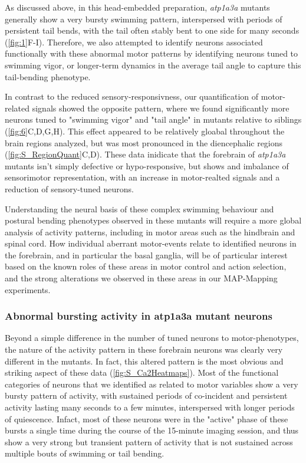 As discussed above, in this head-embedded preparation, \emph{atp1a3a} mutants generally show a very bursty swimming pattern, interspersed with periods of persistent tail bends, with the tail often stably bent to one side for many seconds (\autoref{fig:1}F-I).
Therefore, we also attempted to identify neurons associated functionally with these abnormal motor patterns by identifying neurons tuned to swimming vigor, or longer-term dynamics in the average tail angle to capture this tail-bending phenotype.


In contrast to the reduced sensory-responsivness, our quantification of motor-related signals showed the opposite pattern, where we found significantly more neurons tuned to "swimming vigor" and "tail angle" in mutants relative to siblings (\autoref{fig:6}C,D,G,H).
This effect appeared to be relatively gloabal throughout the brain regions analyzed, but was most pronounced in the diencephalic regions (\autoref{fig:S_RegionQuant}C,D).
These data inidicate that the forebrain of \emph{atp1a3a} mutants isn't simply defective or hypo-responsive, but shows and imbalance of sensorimotor representation, with an increase in motor-realted signals and a reduction of sensory-tuned neurons. 

Understanding the neural basis of these complex swimming behaviour and postural bending phenotypes observed in these mutants will require a more global analysis of activity patterns, including in motor areas such as the hindbrain and spinal cord. 
How individual aberrant motor-events relate to identified neurons in the forebrain, and in particular the basal ganglia, will be of particular interest based on the known roles of these areas in motor control and action selection, and the strong alterations we observed in these areas in our MAP-Mapping experiments. 

\subsubsection{Abnormal bursting activity in atp1a3a mutant neurons}


Beyond a simple difference in the number of tuned neurons to motor-phenotypes, the nature of the activity pattern in these forebrain neurons was clearly very different in the mutants. 
In fact, this altered pattern is the most obvious and striking aspect of these data (\autoref{fig:S_Ca2Heatmaps}). 
Most of the functional categories of neurons that we identified as related to motor variables show a very bursty pattern of activity, with sustained periods of co-incident and persistent activity lasting many seconds to a few minutes, interspersed with longer periods of quiescence. 
Infact, most of these neurons were in the "active" phase of these bursts a single time during the course of the 15-minute imaging session, and thus show a very strong but transient pattern of activity that is not sustained across multiple bouts of swimming or tail bending.

